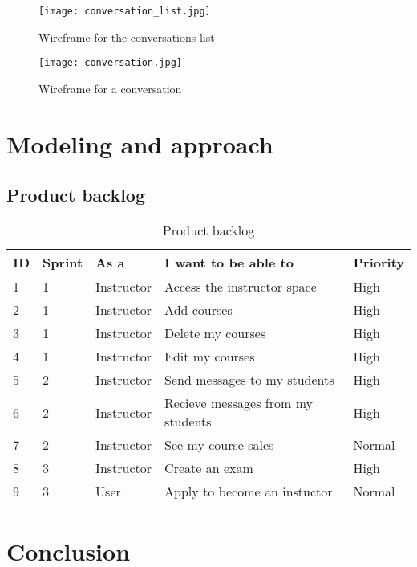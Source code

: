 \begin{figure}[!ht]
    \centering
    \texttt{[image: conversation\_list.jpg]}
    \caption{Wireframe for the conversations list}
    \label{fig:conversation_list}
\end{figure}


\vfill
\clearpage

\begin{figure}[!ht]
    \centering
    \texttt{[image: conversation.jpg]}
    \caption{Wireframe for a conversation}
    \label{fig:conversation}
\end{figure}


\section{Modeling and approach}

\subsection{Product backlog}
\begin{table}[H]
\centering
\caption{Product backlog}
\begin{tabular}{|p{1cm}|p{1.5cm}|p{3cm}|p{6cm}|p{2cm}|}
\hline
\rowcolor{brown!18}\textbf{\large{ID}} & \textbf{\large{Sprint}} & \textbf{\large{As a}}  & \textbf{\large{I want to be able to}} & \textbf{\large{Priority}} \\
\hline
1& 1 & Instructor & Access the instructor space & High\\\hline
2& 1 & Instructor & Add courses  & High\\\hline
3& 1 & Instructor & Delete my courses  & High\\\hline
4& 1& Instructor & Edit my courses  & High\\\hline
5& 2& Instructor & Send messages to my students & High\\\hline
6& 2& Instructor & Recieve messages from my students  & High\\\hline
7& 2& Instructor  & See my course sales & Normal \\\hline
8& 3& Instructor & Create an exam & High\\\hline
9& 3& User & Apply to become an instuctor  & Normal \\\hline
\end{tabular}
\end{table}



\section*{Conclusion}
